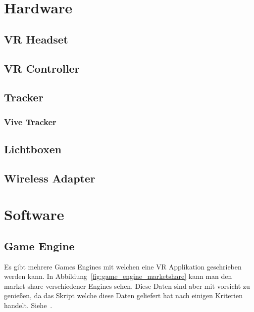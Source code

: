 \section{Hardware}

\subsection{VR Headset}\label{sec:vr-headset}

\subsection{VR Controller}\label{sec:vr-controller}

\subsection{Tracker}\label{sec:tracker}

\subsubsection{Vive Tracker}\label{sec:vive-tracker}

\subsection{Lichtboxen}\label{sec:lighthouse}

\subsection{Wireless Adapter }

\section{Software}

\subsection{Game Engine}

Es gibt mehrere Games Engines mit welchen eine VR Applikation geschrieben werden kann.
In Abbildung~\ref{fig:game_engine_marketshare} kann man den market share verschiedener Engines sehen.
Diese Daten sind aber mit vorsicht zu genießen, da das Skript welche diese Daten geliefert hat nach einigen Kriterien handelt.
Siehe~\cite{REDDIT_2018}.

